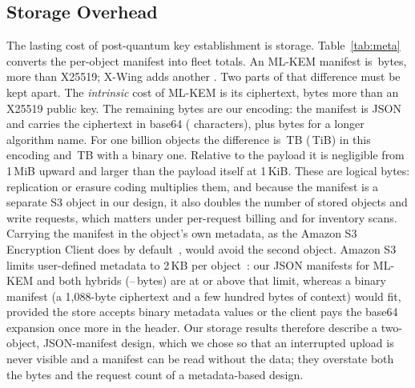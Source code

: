 \documentclass[conference]{IEEEtran}
\begin{document}
\subsection{Storage Overhead}\label{sec:metadata}
The lasting cost of post-quantum key establishment is storage. Table~\ref{tab:meta} converts the
per-object manifest into fleet totals. An ML-KEM manifest is \RevMetaMLKEM\,bytes,
\RevMetaExtraMLKEM{} more than X25519; X-Wing adds another \RevMetaXwingOverMLKEM. Two parts of
that difference must be kept apart. The \emph{intrinsic} cost of ML-KEM is its ciphertext,
\RevMetaIntrinsic{} bytes more than an X25519 public key. The remaining
\RevMetaEncodingOverhead{} bytes are our encoding: the manifest is JSON and carries the
ciphertext in base64 (\RevMetaBaseSixtyFour{} characters), plus \RevMetaNameBytes{} bytes for a
longer algorithm name. For one billion objects the difference is \RevMetaBillionTB\,TB
(\RevMetaBillionTiB\,TiB) in this encoding and \RevMetaIntrinsicBillionTB\,TB with a binary
one.
Relative to the payload it is negligible from 1\,MiB upward and larger than the payload itself at
1\,KiB. These are logical bytes: replication or erasure coding multiplies them, and because the
manifest is a separate S3 object in our design, it also doubles the number of stored objects and
write requests, which matters under per-request billing and for inventory scans. Carrying the
manifest in the object's own metadata, as the Amazon S3 Encryption Client does by
default~\cite{s3ec}, would avoid the second object. Amazon S3 limits user-defined metadata to
2\,KB per object~\cite{s3metadata}: our JSON manifests for ML-KEM and both hybrids
(\RevMetaMLKEM--\RevMetaStudyHybrid\,bytes) are at or above that limit, whereas a binary
manifest (a 1{,}088-byte ciphertext and a few hundred bytes of context) would fit, provided the
store accepts binary metadata values or the client pays the base64 expansion once more in the
header. Our storage results therefore describe a two-object, JSON-manifest design, which we
chose so that an interrupted upload is never visible and a manifest can be read without the
data; they overstate both the bytes and the request count of a metadata-based design.

\begin{table}[t]
\caption{Manifest size per object and its scaling, for this study's JSON/base64 manifest. Extra bytes are relative to X25519; \RevMetaIntrinsic{} of ML-KEM's \RevMetaExtraMLKEM{} are ciphertext, the rest is encoding.}
\label{tab:meta}
\centering\footnotesize
\setlength{\tabcolsep}{2.5pt}
\resizebox{\columnwidth}{!}{}
\end{table}
\end{document}
